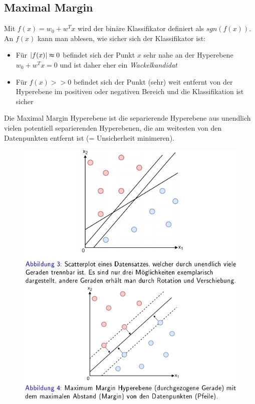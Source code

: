 \documentclass{report}
\begin{document}
  \subsection{Maximal Margin}	
  Mit $f(x) = w_0 + w^Tx$ wird der binäre Klassifikator definiert als $sgn(f(x))$.\\	
  An $f(x)$ kann man ablesen, wie sicher sich der Klassifikator ist:\\	
  \vspace*{-1.5em}	
  \begin{itemize}	
    \item Für $|f(x)| \thickapprox 0$ befindet sich der Punkt $x$ sehr nahe an der Hyperebene	
    $w_0 + w^Tx = 0$ und ist daher eher ein \textit{Wackelkandidat}	
    \item Für $f(x) >> 0$ befindet sich der Punkt (sehr) weit entfernt von der Hyperebene	
    im positiven oder negativen Bereich und die Klassifikation ist sicher	
  \end{itemize}	
  
  Die Maximal Margin Hyperebene ist die separierende Hyperebene aus unendlich vielen potentiell separierenden	
  Hyperebenen, die am weitesten von den Datenpunkten entfernt ist (= Unsicherheit minimeren).	
  
  \begin{figure}[H]	
    \centering	
    \begin{minipage}[b]{0.4\textwidth}	
      \includegraphics[scale=.265]{ml06_3}	
    \end{minipage}	
    \hfill	
    \begin{minipage}[b]{0.4\textwidth}	
      \includegraphics[scale=.275]{ml06_4}	
    \end{minipage}	
  \end{figure}	
  
\end{document}
